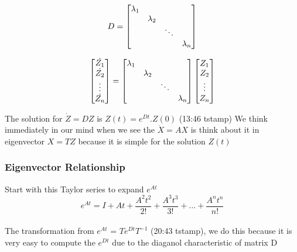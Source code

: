 \begin{equation} 
  D = 
  \begin{bmatrix}
        $$\lambda_{1}$$ &  &  &\\ 
        & $$\lambda_{2}$$   &  &\\ 
        & & \ddots & \\ 
        & & & $$\lambda_{n}$$
  \end{bmatrix}
\end{equation}

\begin{equation}     
  \begin{bmatrix}
    $$\dot{Z_1}$$\\ 
    $$\dot{Z_2}$$\\ 
    \vdots\\
    $$\dot{Z_n}$$ 
  \end{bmatrix}
  =
  \begin{bmatrix}
    $$\lambda_{1}$$ &  &  &\\ 
    & $$\lambda_{2}$$   &  &\\ 
    & & \ddots & \\ 
    & & & $$\lambda_{n}$$
  \end{bmatrix}
  \begin{bmatrix}
    $$Z_1$$\\ 
    $$Z_2$$\\ 
    \vdots\\
    $$Z_n$$ 
  \end{bmatrix}
\end{equation}

The solution for $\dot{Z} = DZ$  is $Z(t) = e^{Dt}.Z(0)$ (13:46 tstamp)
We think immediately in our mind 
when we see the $\dot{X} = AX$
is think about it in eigenvector $X = TZ$
because it is simple for the solution $Z(t)$




\subsubsection{Eigenvector Relationship}
Start with this Taylor series to expand $e^{At}$
\begin{equation}
  e^{At} = I + At + \frac{ A^{2}t^{2} }{2!} + \frac{ A^{3}t^{3} }{3!} + \ldots + \frac{ A^{n}t^{n} }{n!}
\end{equation}
\\The transformation from $e^{At}$ = $Te^{Dt}T^{-1}$ (20:43 tstamp), 
we do this because it is very easy to compute the $e^{Dt}$ due to the diaganol characteristic of matrix D



